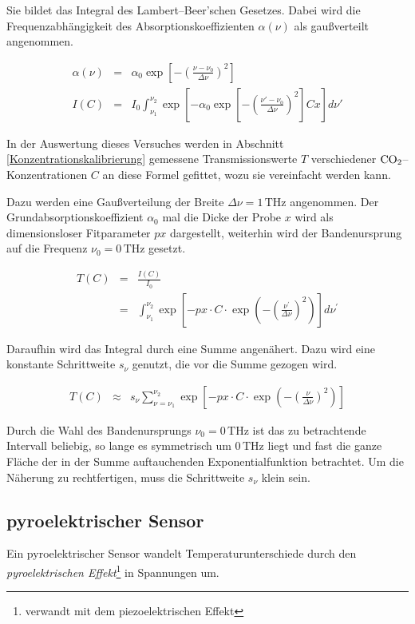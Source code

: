 \documentclass[12pt,a4paper]{scrartcl}
\numberwithin{equation}{section} %
\begin{document}
Sie bildet das Integral des Lambert--Beer'schen Gesetzes. Dabei wird die Frequenzabhängigkeit des Absorptionskoeffizienten $\alpha(\nu)$ als gaußverteilt angenommen.

\begin{eqnarray}
  \alpha(\nu) &=& \alpha_0 \exp[- \left(\frac{\nu - \nu_0}{\Delta \nu}\right)^2] \\
  I(C) &=& I_0 \int_{\nu_1}^{\nu_2} \exp[-\alpha_0 \exp \left[- \left(\frac{\nu' - \nu_0}{\Delta \nu}\right)^2\right] C x] d\nu' \label{eq:Lambert-Beer-Gauß}
\end{eqnarray}

\noindent
In der Auswertung dieses Versuches werden in Abschnitt \ref{Konzentrationskalibrierung} gemessene Transmissionswerte $T$ verschiedener $\ce{CO_2}$--Konzentrationen $C$ an diese Formel gefittet, wozu sie vereinfacht werden kann.

Dazu werden eine Gaußverteilung der Breite $\Delta \nu=1\mathrm{\,THz}$ angenommen. Der Grundabsorptionskoeffizient $\alpha_0$ mal die Dicke der Probe $x$ wird als dimensionsloser Fitparameter $px$ dargestellt, weiterhin wird der Bandenursprung auf die Frequenz $\nu_0=0\mathrm{\,THz}$ gesetzt.

\begin{eqnarray}
  T(C) &=& \frac{I(C)}{I_0} \\
  &=& \int_{\nu_1}^{\nu_2} \exp[- px \cdot C \cdot \exp(- \left(\frac{\nu^{\prime}}{\Delta \nu}\right)^2)] d\nu^\prime
\end{eqnarray}

\noindent
Daraufhin wird das Integral durch eine Summe angenähert. Dazu wird eine konstante Schrittweite $s_\nu$ genutzt, die vor die Summe gezogen wird.

\begin{eqnarray}
  T(C) &\approx& s_\nu \sum_{\nu = \nu_1}^{\nu_2} \exp[- px \cdot C \cdot \exp(-\left(\frac{\nu}{\Delta \nu}\right)^2)]
  \label{eq:Lambert-Beer-Gauß_vereinfacht}
\end{eqnarray}

\noindent
Durch die Wahl des Bandenursprungs $\nu_0=0\mathrm{\,THz}$ ist das zu betrachtende Intervall beliebig, so lange es symmetrisch um $0\mathrm{\,THz}$ liegt und fast die ganze Fläche der in der Summe auftauchenden Exponentialfunktion betrachtet. Um die Näherung zu rechtfertigen, muss die Schrittweite $s_\nu$ klein sein.

\subsection{pyroelektrischer Sensor}
Ein pyroelektrischer Sensor wandelt Temperaturunterschiede durch den \emph{pyroelektrischen Effekt}\footnote{verwandt mit dem piezoelektrischen Effekt} in Spannungen um.
\end{document}
